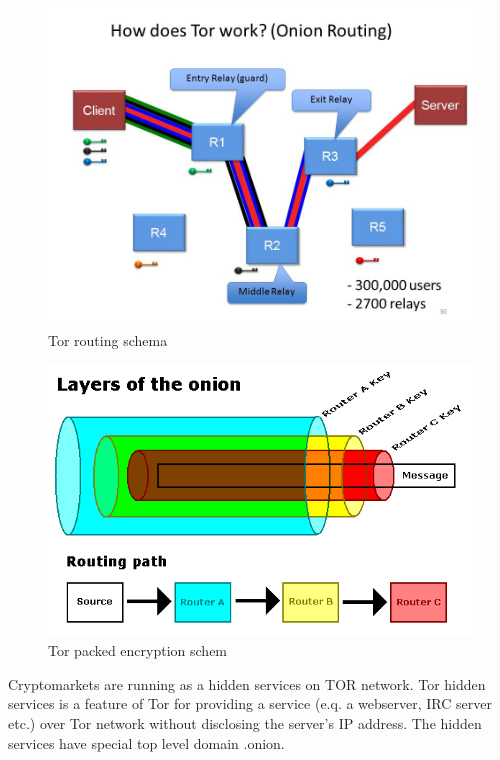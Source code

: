 \documentclass[
  digital, %
  table,   %
  lof,     %
  lot,     %
  oneside
]{fithesis3}
\begin{document}
\begin{figure}[!htb]
    \centering
    \includegraphics[width=1\textwidth]{tor-prejate}
    \caption{Tor routing schema}
    \label{Tor routing schema}
\end{figure}
 
\begin{figure}[!htb]
    \centering
    \includegraphics[width=1\textwidth]{tor-packet-prejate}
    \caption{Tor packed encryption schem}
    \label{Tor packed encryption schema}
\end{figure}
 
Cryptomarkets are running as a hidden services on TOR network.
Tor hidden services is a feature of Tor for providing a service (e.q. a webserver, IRC server etc.) over Tor network
without disclosing the server's IP address. The hidden services have special top level domain .onion.
\end{document}
